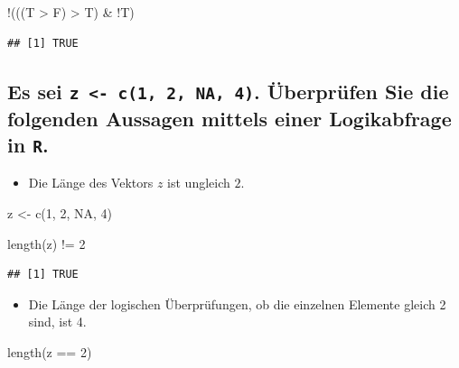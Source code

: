 \documentclass[12pt,a4paper]{article}
\newenvironment{Shaded}{\begin{snugshade}}{\end{snugshade}}
\newcommand{\ConstantTok}[1]{\textcolor[rgb]{0.00,0.00,0.00}{#1}}
\newcommand{\DecValTok}[1]{\textcolor[rgb]{0.00,0.00,0.81}{#1}}
\newcommand{\FunctionTok}[1]{\textcolor[rgb]{0.00,0.00,0.00}{#1}}
\newcommand{\NormalTok}[1]{#1}
\newcommand{\OtherTok}[1]{\textcolor[rgb]{0.56,0.35,0.01}{#1}}
\newcommand{\SpecialCharTok}[1]{\textcolor[rgb]{0.00,0.00,0.00}{#1}}
\begin{document}
\begin{Shaded}
\begin{Highlighting}[]
    \SpecialCharTok{!}\NormalTok{(((T }\SpecialCharTok{\textgreater{}}\NormalTok{ F) }\SpecialCharTok{\textgreater{}}\NormalTok{ T) }\SpecialCharTok{\&} \SpecialCharTok{!}\NormalTok{T)}
\end{Highlighting}
\end{Shaded}

\begin{verbatim}
## [1] TRUE
\end{verbatim}

\hypertarget{es-sei-z---c1-2-na-4.-uxfcberpruxfcfen-sie-die-folgenden-aussagen-mittels-einer-logikabfrage-in-r.}{%
\subsection{\texorpdfstring{Es sei
\texttt{z\ \textless{}-\ c(1,\ 2,\ NA,\ 4)}. Überprüfen Sie die
folgenden Aussagen mittels einer Logikabfrage in
\texttt{R}.}{Es sei z \textless- c(1, 2, NA, 4). Überprüfen Sie die folgenden Aussagen mittels einer Logikabfrage in R.}}\label{es-sei-z---c1-2-na-4.-uxfcberpruxfcfen-sie-die-folgenden-aussagen-mittels-einer-logikabfrage-in-r.}}

\begin{itemize}
  \item Die Länge des Vektors $z$ ist ungleich $2$.
\end{itemize}

\begin{Shaded}
\begin{Highlighting}[]
\NormalTok{    z }\OtherTok{\textless{}{-}} \FunctionTok{c}\NormalTok{(}\DecValTok{1}\NormalTok{, }\DecValTok{2}\NormalTok{, }\ConstantTok{NA}\NormalTok{, }\DecValTok{4}\NormalTok{)}
    
    \FunctionTok{length}\NormalTok{(z) }\SpecialCharTok{!=} \DecValTok{2}
\end{Highlighting}
\end{Shaded}

\begin{verbatim}
## [1] TRUE
\end{verbatim}

\begin{itemize}
  \item Die Länge der logischen Überprüfungen, ob die einzelnen Elemente gleich 2 sind, ist 4.
\end{itemize}

\begin{Shaded}
\begin{Highlighting}[]
    \FunctionTok{length}\NormalTok{(z }\SpecialCharTok{==} \DecValTok{2}\NormalTok{)}
\end{Highlighting}
\end{Shaded}
\end{document}
